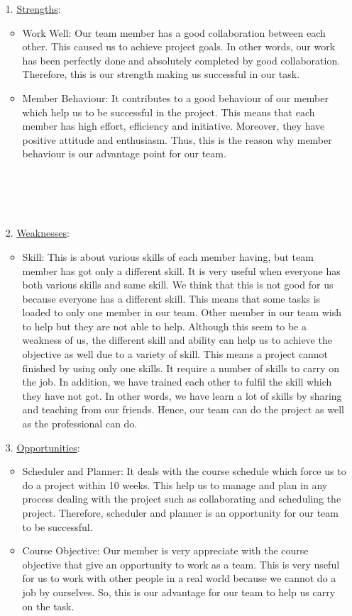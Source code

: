 \documentclass[11pt]{article}
\begin{document}
	\begin{itemize}
		\item[1. ]\underline{Strengths}: 
		\begin{itemize}
			\item{} Work Well: Our team member has a good collaboration between each other. This caused us to achieve project goals. In other words, our work has been perfectly done and absolutely completed by good collaboration. Therefore, this is our strength making us successful in our task. 
			\item{} Member Behaviour: It contributes to a good behaviour of our member which help us to be successful in the project. This means that each member has high effort, efficiency and initiative. Moreover, they have positive attitude and enthusiasm. Thus, this is the reason why member behaviour is our advantage point for our team. \\\\\\\\\\
  		\end{itemize}				
		
		\item[2. ] \underline{Weaknesses}:
		\begin{itemize}
			\item{} Skill: This is about various skills of each member having, but team member has got only a different skill. It is very useful when everyone has both various skills and same skill. We think that this is not good for us because everyone has a different skill. This means that some tasks is loaded to only one member in our team. Other member in our team wish to help but they are not able to help. Although this seem to be a weakness of us, the different skill and ability can help us to achieve the objective as well due to a variety of skill. This means a project cannot finished by using only one skills. It require a number of skills to carry on the job. In addition, we have trained each other to fulfil the skill which they have not got. In other words, we have learn a lot of skills by sharing and teaching from our friends. Hence, our team can do the project as well as the professional can do.
  		\end{itemize}					

		\item[3. ] \underline{Opportunities}: 
		\begin{itemize}
			\item{} Scheduler and Planner: It deals with the course schedule which force us to do a project within 10 weeks. This help us to manage and plan in any process dealing with the project such as collaborating and scheduling the project. Therefore, scheduler and planner is an opportunity for our team to be successful. 
			\item{} Course Objective: Our member is very appreciate with the course objective that give an opportunity to work as a team. This is very useful for us to work with other people in a real world because we cannot do a job by ourselves. So, this is our advantage for our team to help us carry on the task.
  		\end{itemize}				


\end{itemize}
\end{document}
